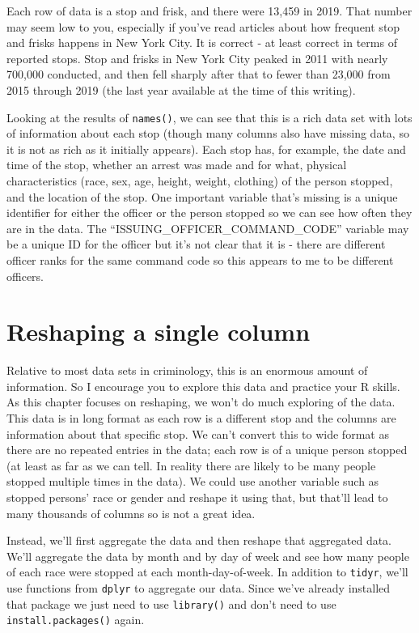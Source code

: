 \documentclass[
]{krantz}
\begin{document}
Each row of data is a stop and frisk, and there were 13,459
in 2019. That number may seem low to you, especially if
you've read articles about how frequent stop and frisks
happens in New York City. It is correct - at least correct
in terms of reported stops. Stop and frisks in New York City
peaked in 2011 with nearly 700,000 conducted, and then fell
sharply after that to fewer than 23,000 from 2015 through
2019 (the last year available at the time of this writing).

Looking at the results of \texttt{names()}, we can see that
this is a rich data set with lots of information about each
stop (though many columns also have missing data, so it is
not as rich as it initially appears). Each stop has, for
example, the date and time of the stop, whether an arrest
was made and for what, physical characteristics (race, sex,
age, height, weight, clothing) of the person stopped, and
the location of the stop. One important variable that's
missing is a unique identifier for either the officer or the
person stopped so we can see how often they are in the data.
The ``ISSUING\_OFFICER\_COMMAND\_CODE'' variable may be a
unique ID for the officer but it's not clear that it is -
there are different officer ranks for the same command code
so this appears to me to be different officers.

\hypertarget{reshaping-a-single-column}{%
\section{Reshaping a single
column}\label{reshaping-a-single-column}}

Relative to most data sets in criminology, this is an
enormous amount of information. So I encourage you to
explore this data and practice your R skills. As this
chapter focuses on reshaping, we won't do much exploring of
the data. This data is in long format as each row is a
different stop and the columns are information about that
specific stop. We can't convert this to wide format as there
are no repeated entries in the data; each row is of a unique
person stopped (at least as far as we can tell. In reality
there are likely to be many people stopped multiple times in
the data). We could use another variable such as stopped
persons' race or gender and reshape it using that, but
that'll lead to many thousands of columns so is not a great
idea.

Instead, we'll first aggregate the data and then reshape
that aggregated data. We'll aggregate the data by month and
by day of week and see how many people of each race were
stopped at each month-day-of-week. In addition to
\texttt{tidyr}, we'll use functions from \texttt{dplyr} to
aggregate our data. Since we've already installed that
package we just need to use \texttt{library()} and don't
need to use \texttt{install.packages()} again.
\end{document}

